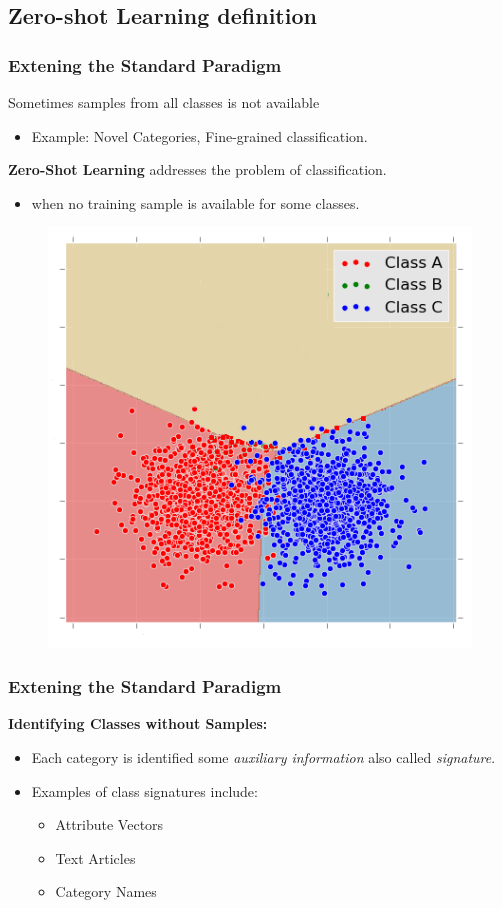 \documentclass{beamer}
\begin{document}
\subsection{Zero-shot Learning definition}
\begin{frame}
  \frametitle{Extening the Standard Paradigm}
  Sometimes samples from all classes is not available
  \begin{itemize}
    \item Example: Novel Categories, Fine-grained classification.
  \end{itemize}

  \textbf{Zero-Shot Learning} addresses the problem of classification.
  \begin{itemize}
    \item[]  when no training sample is available for some classes.
  \end{itemize}
  \begin{figure}
  \includegraphics[width= 0.3\linewidth]{zero.png}
  \end{figure}
\end{frame}
\begin{frame}\frametitle{Extening the Standard Paradigm}
\textbf{Identifying Classes without Samples:}
\begin{itemize}
  \item Each category is identified some \textit{auxiliary information} also called
  \textit{signature}.
  \item Examples of class signatures include:
  \begin{itemize}
    \item Attribute Vectors
    \item Text Articles
    \item Category Names
  \end{itemize}
\end{itemize}
\end{frame}
\end{document}
